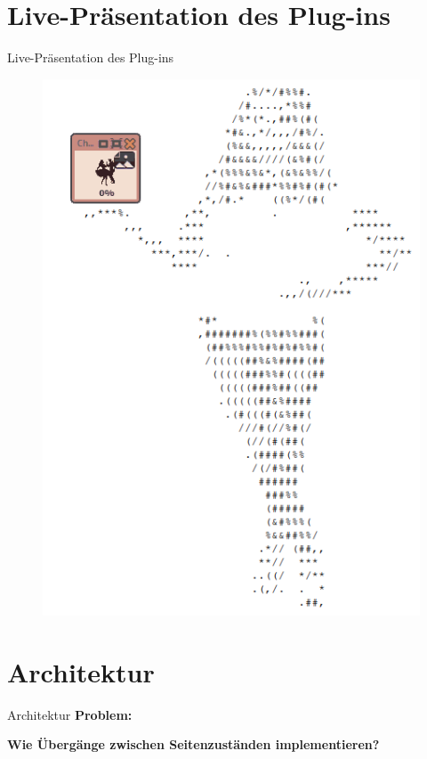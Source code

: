 \documentclass{beamer}
\begin{document}
\section{Live-Präsentation des Plug-ins}
\begin{frame}{Live-Präsentation des Plug-ins}
\begin{figure}
\center
\begin{minipage}{.45\textwidth}
\includegraphics[width=\textwidth]{figures/presenting-plugin/presenting-plugin-composition.png}
\end{minipage}
\end{figure}
\end{frame}

\section{Architektur}
\begin{frame}{Architektur}
\textbf{Problem:}\\
\hspace{1em}%
\begin{minipage}[c]{0.95\textwidth}
\flushleft \textbf{Wie Übergänge zwischen Seitenzuständen implementieren?}
\end{minipage}
\end{frame}
\end{document}
